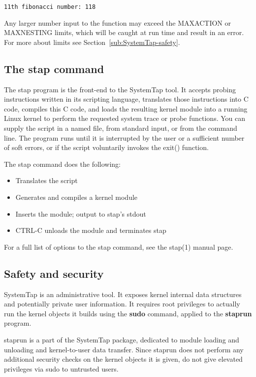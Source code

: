 \documentclass[twoside,english]{article}
\newenvironment{vindent}
{\begin{list}{}{\setlength{\listparindent}{6pt}}
\item[]}
{\end{list}}
\begin{document}
\begin{vindent}
\begin{verbatim}
11th fibonacci number: 118
\end{verbatim}
\end{vindent}
Any larger number input to the function may exceed the MAXACTION or MAXNESTING
limits, which will be caught at run time and result in an error. For more
about limits see Section~\ref{sub:SystemTap-safety}.
\newpage{}
\subsection{The stap command}
The stap program is the front-end to the SystemTap tool. It accepts probing
instructions written in its scripting language, translates those instructions
into C code, compiles this C code, and loads the resulting kernel module
into a running Linux kernel to perform the requested system trace or probe
functions. You can supply the script in a named file, from standard input,
or from the command line. The program runs until it is interrupted by the
user or a sufficient number of soft errors, or if the script voluntarily
invokes the exit() function.

The stap command does the following:

\begin{itemize}
\item Translates the script
\item Generates and compiles a kernel module
\item Inserts the module; output to stap's stdout
\item CTRL-C unloads the module and terminates stap
\end{itemize}
For a full list of options to the stap command, see the stap(1) manual page.

\subsection{Safety and security\label{sub:SystemTap-safety}}
SystemTap is an administrative tool. It exposes kernel internal data structures
and potentially private user information. It requires root privileges to
actually run the kernel objects it builds using the \textbf{sudo} command,
applied to the \textbf{staprun} program.

staprun is a part of the SystemTap package, dedicated to module loading and
unloading and kernel-to-user data transfer. Since staprun does not perform
any additional security checks on the kernel objects it is given, do not
give elevated privileges via sudo to untrusted users.
\end{document}
